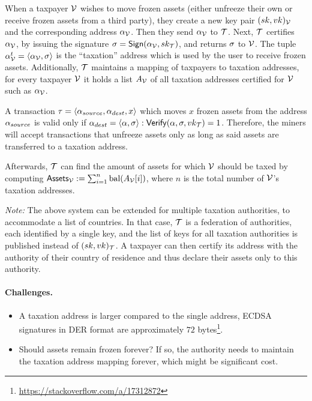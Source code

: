 When a taxpayer $\mathcal{V}$ wishes to move frozen assets (either unfreeze their own
or receive frozen assets from a third party), they create a new key pair
$(sk, vk)_\mathcal{V}$ and the corresponding address $\alpha_\mathcal{V}$. Then they send
$\alpha_\mathcal{V}$ to $\mathcal{T}$. Next, $\mathcal{T}$ certifies $\alpha_\mathcal{V}$, by
issuing the signature $\sigma = \mathsf{Sign}(\alpha_\mathcal{V}, sk_\mathcal{T})$,
and returns $\sigma$ to $\mathcal{V}$. The tuple $\alpha_\mathcal{V}^{t} = \langle
\alpha_\mathcal{V}, \sigma \rangle$ is the ``taxation'' address which is used by the
user to receive frozen assets. Additionally, $\mathcal{T}$ maintains a mapping of
taxpayers to taxation addresses, \ie for every taxpayer $\mathcal{V}$ it holds a list
$A_\mathcal{V}$ of all taxation addresses certified for $\mathcal{V}$ such as
$\alpha_\mathcal{V}$.

A transaction $\tau = \langle \alpha_{source}, \alpha_{dest}, x \rangle$
which moves $x$ frozen assets from the address $\alpha_{source}$ is valid
only if $\alpha_{dest} = \langle \alpha, \sigma \rangle:
\mathsf{Verify}(\alpha, \sigma, vk_\mathcal{T}) = 1$. Therefore, the miners
will accept transactions that unfreeze assets only as long as said assets are
transferred to a taxation address.

Afterwards, $\mathcal{T}$ can find the amount of assets for which $\mathcal{V}$ should
be taxed by computing $\mathsf{Assets}_\mathcal{V} := \sum_{i=1}^{n} \text{bal}(A_{\mathcal{V}}[i])$,
where $n$ is the total number of $\mathcal{V}$'s taxation addresses.

\emph{Note:} The above system can be extended for multiple taxation
authorities, \eg to accommodate a list of countries. In that case, $\mathcal{T}$
is a federation of authorities, each identified by a single key, and
the list of keys for all taxation authorities is published instead of
$(sk, vk)_\mathcal{T}$. A taxpayer can then certify its address with the authority
of their country of residence and thus declare their assets only to this
authority.

\paragraph{Challenges.}

\begin{itemize}
    \item A taxation address is larger compared to the single address, \eg
        ECDSA signatures in DER format are approximately $72$
        bytes\footnote{\url{https://stackoverflow.com/a/17312872}}.
    \item Should assets remain frozen forever? If so, the authority needs to
        maintain the taxation address mapping forever, which might be
        significant cost.
\end{itemize}
